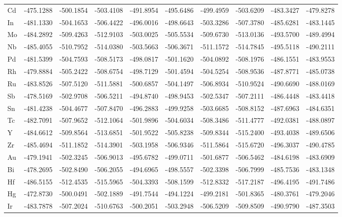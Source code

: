 \begin{table}[h]
{\begin{tabular}{*{10}{l}}
    Cd & -475.1288 & -500.1854 & -503.4108 & -491.8954 & -495.6486 & -499.4959 & -503.6209 & -483.3427 & -479.8278 \\
    In & -481.1330 & -504.1653 & -506.4422 & -496.0016 & -498.6643 & -503.3286 & -507.3780 & -485.6281 & -483.1445 \\
    Mo & -484.2892 & -509.4263 & -512.9103 & -503.0025 & -505.5534 & -509.6730 & -513.0136 & -493.5700 & -489.4994 \\
    Nb & -485.4055 & -510.7952 & -514.0380 & -503.5663 & -506.3671 & -511.1572 & -514.7845 & -495.5118 & -490.2111 \\
    Pd & -481.5399 & -504.7593 & -508.5173 & -498.0817 & -501.1620 & -504.0892 & -508.1976 & -486.1551 & -483.9553 \\
    Rh & -479.8884 & -505.2422 & -508.6754 & -498.7129 & -501.4594 & -504.5254 & -508.9536 & -487.8771 & -485.0738 \\
    Ru & -483.8526 & -507.5120 & -511.5881 & -500.6857 & -504.1497 & -506.8934 & -510.9524 & -490.6690 & -488.0169 \\
    Sb & -478.5169 & -502.9708 & -506.5211 & -494.8740 & -498.9453 & -502.5347 & -507.2111 & -486.4448 & -483.4418 \\
    Sn & -481.4238 & -504.4677 & -507.8470 & -496.2883 & -499.9258 & -503.6685 & -508.8152 & -487.6963 & -484.6351 \\
    Tc & -482.7091 & -507.9652 & -512.1064 & -501.9896 & -504.6034 & -508.3486 & -511.4777 & -492.0381 & -488.0897 \\
    Y  & -484.6612 & -509.8564 & -513.6851 & -501.9522 & -505.8238 & -509.8344 & -515.2400 & -493.4038 & -489.6506 \\
    Zr & -485.4694 & -511.1852 & -514.3901 & -503.1958 & -506.9346 & -511.5864 & -515.6720 & -496.3037 & -490.4785 \\
    Au & -479.1941 & -502.3245 & -506.9013 & -495.6782 & -499.0711 & -501.6877 & -506.5462 & -484.6198 & -483.6909 \\
    Bi & -478.2695 & -502.8490 & -506.2055 & -494.6965 & -498.5557 & -502.3398 & -506.7999 & -485.7536 & -483.1348 \\
    Hf & -486.5155 & -512.4535 & -515.5965 & -504.3393 & -508.1599 & -512.8332 & -517.2187 & -496.4195 & -491.7486 \\
    Hg & -472.8730 & -500.0491 & -502.1889 & -491.7544 & -494.1224 & -499.2181 & -501.8365 & -480.3761 & -479.2046 \\
    Ir & -483.7878 & -507.2024 & -510.6763 & -500.2051 & -503.2948 & -506.5209 & -509.8509 & -490.9790 & -487.3503 \\

\end{tabular}}
\end{table}
